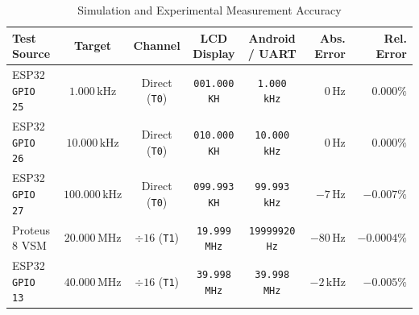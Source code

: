 \documentclass[11pt,a4paper]{article}
\begin{document}
\begin{table}[H]
\centering\small
\caption{Simulation and Experimental Measurement Accuracy}
\label{tab:results}
\renewcommand{\arraystretch}{1.2}
\begin{tabularx}{\textwidth}{X c c c c r r}
\toprule
\textbf{Test Source} & \textbf{Target} & \textbf{Channel} & \textbf{LCD Display} & \textbf{Android / UART} & \textbf{Abs. Error} & \textbf{Rel. Error} \\
\midrule
ESP32 \texttt{GPIO 25} & $1.000\,\text{kHz}$   & Direct (\texttt{T0})   & \texttt{001.000 KH} & \texttt{1.000 kHz}   & $0\,\text{Hz}$    & $0.000\%$ \\
ESP32 \texttt{GPIO 26} & $10.000\,\text{kHz}$  & Direct (\texttt{T0})   & \texttt{010.000 KH} & \texttt{10.000 kHz}  & $0\,\text{Hz}$    & $0.000\%$ \\
ESP32 \texttt{GPIO 27} & $100.000\,\text{kHz}$ & Direct (\texttt{T0})   & \texttt{099.993 KH} & \texttt{99.993 kHz}  & $-7\,\text{Hz}$   & $-0.007\%$ \\
Proteus 8 VSM          & $20.000\,\text{MHz}$  & $\div 16$ (\texttt{T1})& \texttt{19.999 MHz} & \texttt{19999920 Hz} & $-80\,\text{Hz}$  & $-0.0004\%$ \\
ESP32 \texttt{GPIO 13} & $40.000\,\text{MHz}$  & $\div 16$ (\texttt{T1})& \texttt{39.998 MHz} & \texttt{39.998 MHz}  & $-2\,\text{kHz}$  & $-0.005\%$ \\
\bottomrule
\end{tabularx}
\end{table}
\end{document}
